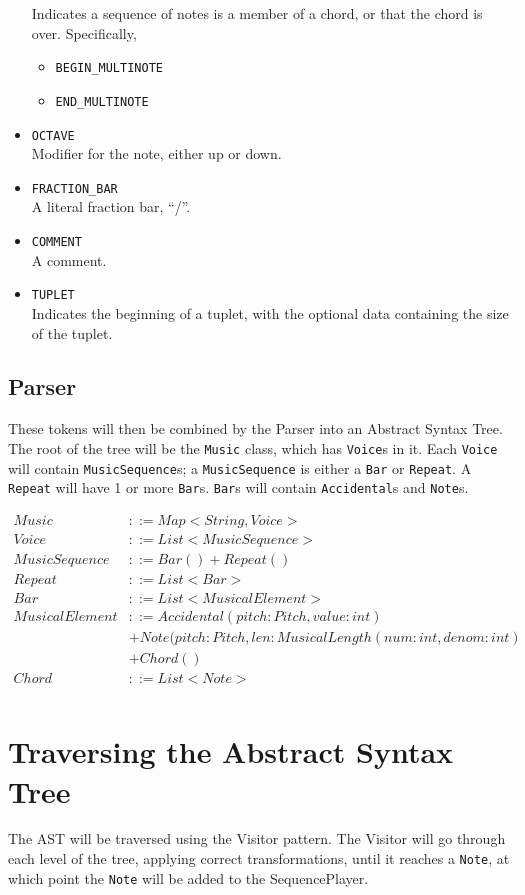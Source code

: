 \documentclass[12pt]{article}
\begin{document}
\begin{itemize}
  Indicates a sequence of notes is a member of a chord, or that the
  chord is over. Specifically,
  \begin{itemize}
  \item \texttt{BEGIN\_MULTINOTE}
  \item \texttt{END\_MULTINOTE}
  \end{itemize}
\item \texttt{OCTAVE}\\
  Modifier for the note, either up or down.
\item \texttt{FRACTION\_BAR}\\
  A literal fraction bar, ``/''.
\item \texttt{COMMENT}\\
  A comment.
\item \texttt{TUPLET}\\
  Indicates the beginning of a tuplet, with the optional data
  containing the size of the tuplet.
\end{itemize}

\subsection{Parser}
These tokens will then be combined by the Parser into an Abstract
Syntax Tree. The root of the tree will be the \texttt{Music} class,
which has \texttt{Voice}s in it. Each \texttt{Voice} will contain
\texttt{MusicSequence}s; a \texttt{MusicSequence} is either a
\texttt{Bar} or \texttt{Repeat}. A \texttt{Repeat} will have 1 or more
\texttt{Bar}s. \texttt{Bar}s will contain \texttt{Accidental}s and
\texttt{Note}s.

\begin{align*}
  Music&::=Map<String, Voice>\\
  Voice&::=List<MusicSequence>\\
  MusicSequence&::=Bar() + Repeat()\\
  Repeat&::=List<Bar>\\
  Bar&::=List<MusicalElement>\\
  MusicalElement&::=Accidental(pitch: Pitch, value: int) \\
  &+ Note(pitch: Pitch, len: MusicalLength(num: int, denom: int)\\
   &+ Chord()\\
  Chord&::=List<Note>\\
\end{align*}

\section{Traversing the Abstract Syntax Tree}
The AST will be traversed using the Visitor pattern. The Visitor will
go through each level of the tree, applying correct transformations,
until it reaches a \texttt{Note}, at which point the \texttt{Note}
will be added to the SequencePlayer.
\end{document}
